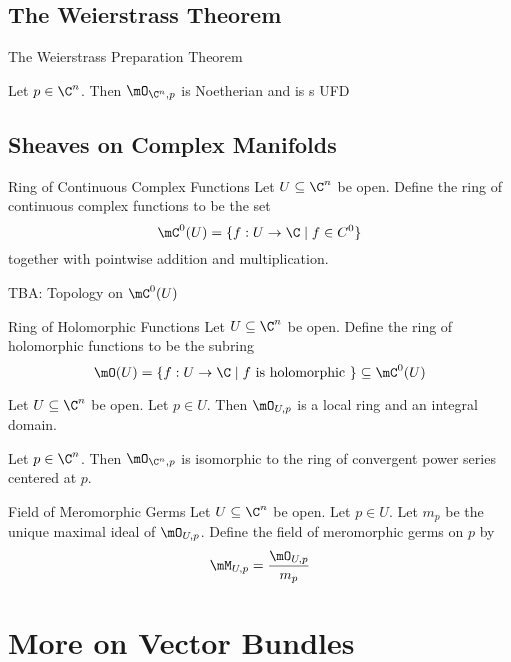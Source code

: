 \documentclass[a4paper]{article}
\begin{document}
\subsection{The Weierstrass Theorem}
\begin{thm}{The Weierstrass Preparation Theorem}{}
\end{thm}

\begin{prp}{}{} Let $p\in\C^n$. Then $\mO_{\C^n,p}$ is Noetherian and is s UFD
\end{prp}

\subsection{Sheaves on Complex Manifolds}
\begin{defn}{Ring of Continuous Complex Functions}{} Let $U\subseteq\C^n$ be open. Define the ring of continuous complex functions to be the set $$\mC^0(U)=\{f:U\to\C\;|\;f\in C^0\}$$ together with pointwise addition and multiplication. 
\end{defn}

TBA: Topology on $\mC^0(U)$

\begin{defn}{Ring of Holomorphic Functions}{} Let $U\subseteq\C^n$ be open. Define the ring of holomorphic functions to be the subring $$\mO(U)=\{f:U\to\C\;|\;f\text{ is holomorphic }\}\subseteq\mC^0(U)$$
\end{defn}

\begin{prp}{}{} Let $U\subseteq\C^n$ be open. Let $p\in U$. Then $\mO_{U,p}$ is a local ring and an integral domain. 
\end{prp}

\begin{prp}{}{} Let $p\in\C^n$. Then $\mO_{\C^n,p}$ is isomorphic to the ring of convergent power series centered at $p$. 
\end{prp}

\begin{defn}{Field of Meromorphic Germs}{} Let $U\subseteq\C^n$ be open. Let $p\in U$. Let $m_p$ be the unique maximal ideal of $\mO_{U,p}$. Define the field of meromorphic germs on $p$ by $$\mM_{U,p}=\frac{\mO_{U,p}}{m_p}$$
\end{defn}

\pagebreak
\section{More on Vector Bundles}
\end{document}
